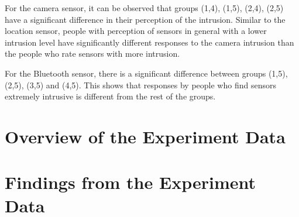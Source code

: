 For the camera sensor, it can be observed that groups (1,4), (1,5), (2,4), (2,5) have a significant difference in their perception of the intrusion.
Similar to the location sensor, people with perception of sensors in general with a lower intrusion level have significantly different responses to the camera intrusion than the people who rate sensors with more intrusion.

For the Bluetooth sensor, there is a significant difference between groups (1,5), (2,5), (3,5) and (4,5). This shows that responses by people who find sensors extremely intrusive is different from the rest of the groups.


\section{Overview of the Experiment Data}

\section{Findings from the Experiment Data}



